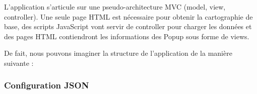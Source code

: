 L'application s'articule sur une pseudo-architecture MVC (model, view, controller). Une seule page HTML est nécessaire pour obtenir la cartographie de base, des scripts JavaScript vont servir de controller pour charger les données et des pages HTML contiendront les informations des Popup sous forme de views.

De fait, nous pouvons imaginer la structure de l'application de la manière suivante : 

\noindent{}





\subsubsection{Configuration JSON}


